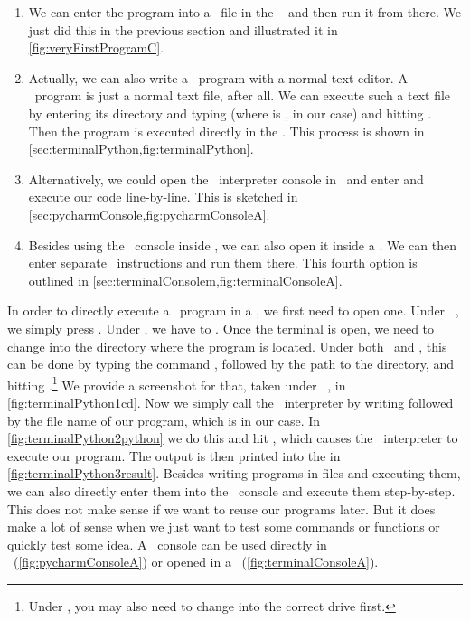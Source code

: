 \begin{enumerate}%
%
\item We can enter the program into a \python\ file in the \pycharm\  and then run it from there. %
We just did this in the previous section and illustrated it in \cref{fig:veryFirstProgramC}.%
%
\item Actually, we can also write a \python\ program with a normal text editor. %
A \python\ program is just a normal text file, after all. %
We can execute such a text file by entering its directory and typing  (where  is , in our case) and hitting \keys{\enter}. %
Then the program is executed directly in the . %
This process is shown in \cref{sec:terminalPython,fig:terminalPython}.%
%
\item Alternatively, we could open the \python\ interpreter console in \pycharm\ and enter and execute our code line-by-line. %
This is sketched in \cref{sec:pycharmConsole,fig:pycharmConsoleA}.%
%
\item Besides using the \python\ console inside \pycharm, we can also open it inside a . %
We can then enter separate \python\ instructions and run them there. %
This fourth option is outlined in \cref{sec:terminalConsolem,fig:terminalConsoleA}.%
%
\end{enumerate}%
%
%
\label{sec:terminalPython}%
In order to directly execute a \python\ program in a , we first need to open one.
Under \ubuntu\ \linux, we simply press \ubuntuTerminal.
Under \microsoftWindows, we have to \windowsTerminal.
Once the terminal is open, we need to change into the directory where the program is located.
Under both \linux\ and \microsoftWindows, this can be done by typing the command , followed by the path to the directory, and hitting \keys{\enter}.\footnote{%
Under \microsoftWindows, you may also need to change into the correct drive first.}
We provide a screenshot for that, taken under \ubuntu\ \linux, in \cref{fig:terminalPython1cd}.
Now we simply call the \python\ interpreter by writing  followed by the file name of our program, which is  in our case.
In \cref{fig:terminalPython2python} we do this and hit \keys{\enter}, which causes the \python\ interpreter to execute our program.
The output  is then printed into the  in \cref{fig:terminalPython3result}.%
\endhsection%
%
%
\label{sec:pycharmConsole}%
Besides writing programs in files and executing them, we can also directly enter them into the \python\ console and execute them step-by-step.
This does not make sense if we want to reuse our programs later.
But it does make a lot of sense when we just want to test some commands or functions or quickly test some idea.
A \python\ console can be used directly in \pycharm~(\cref{fig:pycharmConsoleA}) or opened in a ~(\cref{fig:terminalConsoleA}).

